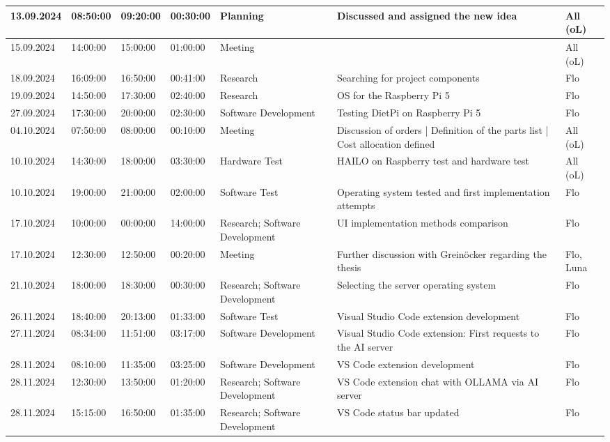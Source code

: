 \begin{longtable}{@{}p{1.8cm} p{1.2cm} p{1.2cm} p{1.2cm} p{2cm} p{4.5cm} p{2cm}@{}}
    13.09.2024 & 08:50:00 & 09:20:00 & 00:30:00 & Planning & Discussed and assigned the new idea & All (oL) \\
    \hline
    15.09.2024 & 14:00:00 & 15:00:00 & 01:00:00 & Meeting & & All (oL) \\
    \hline
    18.09.2024 & 16:09:00 & 16:50:00 & 00:41:00 & Research & Searching for project components & Flo \\
    \hline
    19.09.2024 & 14:50:00 & 17:30:00 & 02:40:00 & Research & OS for the Raspberry Pi 5 & Flo \\
    \hline
    27.09.2024 & 17:30:00 & 20:00:00 & 02:30:00 & Software Development & Testing DietPi on Raspberry Pi 5 & Flo \\
    \hline
    04.10.2024 & 07:50:00 & 08:00:00 & 00:10:00 & Meeting & Discussion of orders | Definition of the parts list | Cost allocation defined & All (oL) \\
    \hline
    10.10.2024 & 14:30:00 & 18:00:00 & 03:30:00 & Hardware Test & HAILO on Raspberry test and hardware test & All (oL) \\
    \hline
    10.10.2024 & 19:00:00 & 21:00:00 & 02:00:00 & Software Test & Operating system tested and first implementation attempts & Flo \\
    \hline
    17.10.2024 & 10:00:00 & 00:00:00 & 14:00:00 & Research; Software Development & UI implementation methods comparison & Flo \\
    \hline
    17.10.2024 & 12:30:00 & 12:50:00 & 00:20:00 & Meeting & Further discussion with Greinöcker regarding the thesis & Flo, Luna \\
    \hline
    21.10.2024 & 18:00:00 & 18:30:00 & 00:30:00 & Research; Software Development & Selecting the server operating system & Flo \\
    \hline
    26.11.2024 & 18:40:00 & 20:13:00 & 01:33:00 & Software Test & Visual Studio Code extension development & Flo \\
    \hline
    27.11.2024 & 08:34:00 & 11:51:00 & 03:17:00 & Software Development & Visual Studio Code extension: First requests to the AI server & Flo \\
    \hline
    28.11.2024 & 08:10:00 & 11:35:00 & 03:25:00 & Software Development & VS Code extension development & Flo \\
    \hline
    28.11.2024 & 12:30:00 & 13:50:00 & 01:20:00 & Research; Software Development & VS Code extension chat with OLLAMA via AI server & Flo \\
    \hline
    28.11.2024 & 15:15:00 & 16:50:00 & 01:35:00 & Research; Software Development & VS Code status bar updated & Flo \\

\end{longtable}
